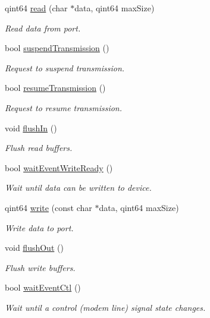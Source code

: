 \begin{DoxyCompactItemize}
qint64 \hyperlink{classmdt_serial_port_posix_a55b73a33f1b9552fbb8821e356a8b930}{read} (char $\ast$data, qint64 maxSize)
\begin{DoxyCompactList}\small\item\em Read data from port. \end{DoxyCompactList}\item 
bool \hyperlink{classmdt_serial_port_posix_ac153ca3658d467c5fe04dba89ead97bc}{suspendTransmission} ()
\begin{DoxyCompactList}\small\item\em Request to suspend transmission. \end{DoxyCompactList}\item 
bool \hyperlink{classmdt_serial_port_posix_a83c71a904b63e09ff4bc4155bbff89ab}{resumeTransmission} ()
\begin{DoxyCompactList}\small\item\em Request to resume transmission. \end{DoxyCompactList}\item 
void \hyperlink{classmdt_serial_port_posix_aefeb623e5b2b31bbb72f83d5735a2a8e}{flushIn} ()
\begin{DoxyCompactList}\small\item\em Flush read buffers. \end{DoxyCompactList}\item 
bool \hyperlink{classmdt_serial_port_posix_ac6e29bfccaa92509f6d86848da45bcc1}{waitEventWriteReady} ()
\begin{DoxyCompactList}\small\item\em Wait until data can be written to device. \end{DoxyCompactList}\item 
qint64 \hyperlink{classmdt_serial_port_posix_a3b70bbabeb933e25ad787f606dca0fb6}{write} (const char $\ast$data, qint64 maxSize)
\begin{DoxyCompactList}\small\item\em Write data to port. \end{DoxyCompactList}\item 
void \hyperlink{classmdt_serial_port_posix_a7371414037fa039269b169856e23aae2}{flushOut} ()
\begin{DoxyCompactList}\small\item\em Flush write buffers. \end{DoxyCompactList}\item 
bool \hyperlink{classmdt_serial_port_posix_a8ec213863c6eacfc8d3079aadc9ef43b}{waitEventCtl} ()
\begin{DoxyCompactList}\small\item\em Wait until a control (modem line) signal state changes. \end{DoxyCompactList}\item 

\end{DoxyCompactItemize}
